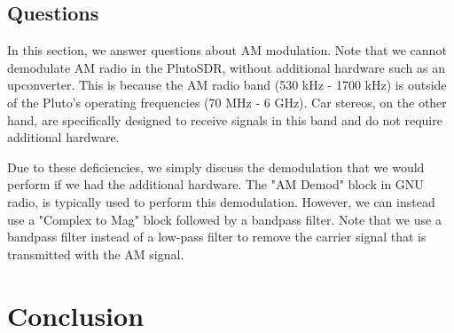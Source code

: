 \documentclass{article}
\begin{document}
\subsection{Questions}

In this section, we answer questions about AM modulation. Note that we cannot demodulate AM radio in the PlutoSDR, without additional hardware such as an upconverter. This is because the AM radio band (530 kHz - 1700 kHz) is outside of the Pluto's operating frequencies (70 MHz - 6 GHz). Car stereos, on the other hand, are specifically designed to receive signals in this band and do not require additional hardware.

Due to these deficiencies, we simply discuss the demodulation that we would perform if we had the additional hardware. The "AM Demod" block in GNU radio, is typically used to perform this demodulation. However, we can instead use a "Complex to Mag" block followed by a bandpass filter. Note that we use a bandpass filter instead of a low-pass filter to remove the carrier signal that is transmitted with the AM signal.
  
\section{Conclusion}

%
%
	
\end{document}

